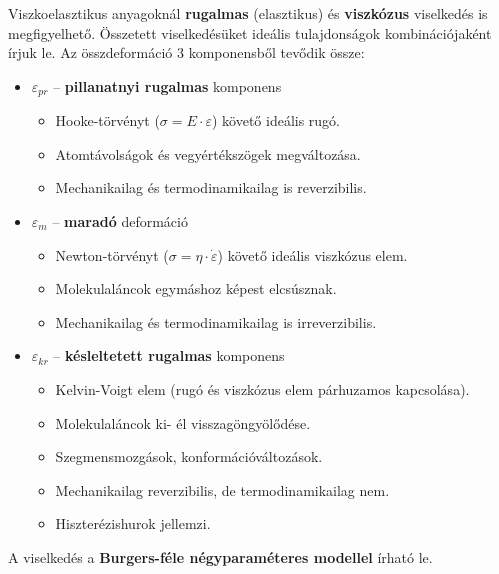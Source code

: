 \documentclass[12pt,a4paper]{article}       %
\newcounter{questionctr}
\newenvironment{question}[1]{
  \refstepcounter{questionctr}
  \begin{tcolorbox}[
    colback=gray!25,
    colbacktitle=red!10!yellow!50,
    enhanced,
    sharp corners,
    boxrule=0mm,
    frame hidden,
    breakable,
    enhanced jigsaw,
    title={\textcolor{black}{\textsc{\# \thequestionctr{} – #1}}}
  ]


}{\end{tcolorbox}}
\begin{document}
\begin{question}{
    Mutassa be a molekulaláncok mechanikai behatásra történő mozgásait. Mutassa
    be részletesen a polimerek deformációkomponenseit! Milyen viselkedési
    jelenségeket mutatnak ezek az anyagok?
  }
  Viszkoelasztikus anyagoknál \textbf{rugalmas} (elasztikus) és
  \textbf{viszkózus} viselkedés is megfigyelhető. Összetett viselkedésüket
  ideális tulajdonságok kombinációjaként írjuk le. Az összdeformáció 3
  komponensből tevődik össze:
  \begin{itemize}
    \item $\varepsilon_{pr}$ – \textbf{pillanatnyi rugalmas} komponens
          \begin{itemize}
            \item Hooke-törvényt ($\sigma = E \cdot \varepsilon$) követő
                  ideális rugó.
            \item Atomtávolságok és vegyértékszögek megváltozása.
            \item Mechanikailag és termodinamikailag is reverzibilis.
          \end{itemize}
    \item $\varepsilon_{m}$ – \textbf{maradó} deformáció
          \begin{itemize}
            \item Newton-törvényt ($\sigma = \eta \cdot \dot{\varepsilon}$)
                  követő ideális viszkózus elem.
            \item Molekulaláncok egymáshoz képest elcsúsznak.
            \item Mechanikailag és termodinamikailag is irreverzibilis.
          \end{itemize}
    \item $\varepsilon_{kr}$ – \textbf{késleltetett rugalmas} komponens
          \begin{itemize}
            \item Kelvin-Voigt elem (rugó és viszkózus elem párhuzamos
                  kapcsolása).
            \item Molekulaláncok ki- él visszagöngyölődése.
            \item Szegmensmozgások, konformációváltozások.
            \item Mechanikailag reverzibilis, de termodinamikailag nem.
            \item Hiszterézishurok jellemzi.
          \end{itemize}
  \end{itemize}
  A viselkedés a \textbf{Burgers-féle négyparaméteres modellel} írható le.
\end{question}
\end{document}
